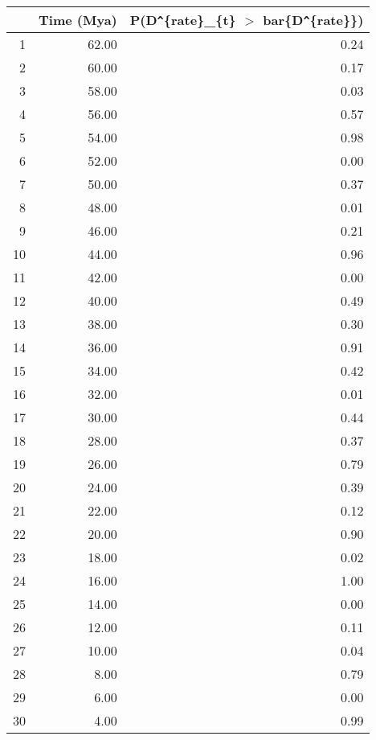 \begin{table}[ht]
\centering
\begin{tabular}{rrr}
  \hline
 & Time (Mya) & P(D\verb|^|\{rate\}\_\{t\} $>$ bar\{D\verb|^|\{rate\}\}) \\ 
  \hline
1 & 62.00 & 0.24 \\ 
  2 & 60.00 & 0.17 \\ 
  3 & 58.00 & 0.03 \\ 
  4 & 56.00 & 0.57 \\ 
  5 & 54.00 & 0.98 \\ 
  6 & 52.00 & 0.00 \\ 
  7 & 50.00 & 0.37 \\ 
  8 & 48.00 & 0.01 \\ 
  9 & 46.00 & 0.21 \\ 
  10 & 44.00 & 0.96 \\ 
  11 & 42.00 & 0.00 \\ 
  12 & 40.00 & 0.49 \\ 
  13 & 38.00 & 0.30 \\ 
  14 & 36.00 & 0.91 \\ 
  15 & 34.00 & 0.42 \\ 
  16 & 32.00 & 0.01 \\ 
  17 & 30.00 & 0.44 \\ 
  18 & 28.00 & 0.37 \\ 
  19 & 26.00 & 0.79 \\ 
  20 & 24.00 & 0.39 \\ 
  21 & 22.00 & 0.12 \\ 
  22 & 20.00 & 0.90 \\ 
  23 & 18.00 & 0.02 \\ 
  24 & 16.00 & 1.00 \\ 
  25 & 14.00 & 0.00 \\ 
  26 & 12.00 & 0.11 \\ 
  27 & 10.00 & 0.04 \\ 
  28 & 8.00 & 0.79 \\ 
  29 & 6.00 & 0.00 \\ 
  30 & 4.00 & 0.99 \\ 
   \hline
\end{tabular}
\label{tab:rate_peak}
\end{table}
